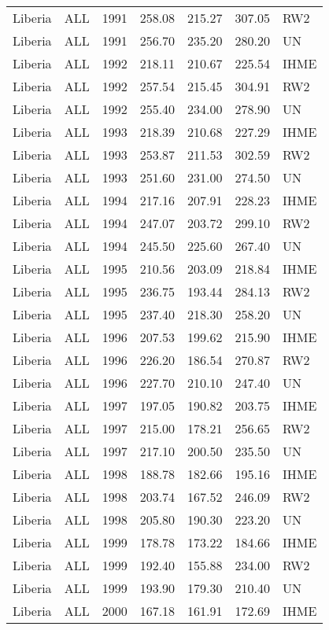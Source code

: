 \begin{longtable}{lllrrrl}
  Liberia & ALL & 1991 & 258.08 & 215.27 & 307.05 & RW2 \\ 
  Liberia & ALL & 1991 & 256.70 & 235.20 & 280.20 & UN \\ 
  Liberia & ALL & 1992 & 218.11 & 210.67 & 225.54 & IHME \\ 
  Liberia & ALL & 1992 & 257.54 & 215.45 & 304.91 & RW2 \\ 
  Liberia & ALL & 1992 & 255.40 & 234.00 & 278.90 & UN \\ 
  Liberia & ALL & 1993 & 218.39 & 210.68 & 227.29 & IHME \\ 
  Liberia & ALL & 1993 & 253.87 & 211.53 & 302.59 & RW2 \\ 
  Liberia & ALL & 1993 & 251.60 & 231.00 & 274.50 & UN \\ 
  Liberia & ALL & 1994 & 217.16 & 207.91 & 228.23 & IHME \\ 
  Liberia & ALL & 1994 & 247.07 & 203.72 & 299.10 & RW2 \\ 
  Liberia & ALL & 1994 & 245.50 & 225.60 & 267.40 & UN \\ 
  Liberia & ALL & 1995 & 210.56 & 203.09 & 218.84 & IHME \\ 
  Liberia & ALL & 1995 & 236.75 & 193.44 & 284.13 & RW2 \\ 
  Liberia & ALL & 1995 & 237.40 & 218.30 & 258.20 & UN \\ 
  Liberia & ALL & 1996 & 207.53 & 199.62 & 215.90 & IHME \\ 
  Liberia & ALL & 1996 & 226.20 & 186.54 & 270.87 & RW2 \\ 
  Liberia & ALL & 1996 & 227.70 & 210.10 & 247.40 & UN \\ 
  Liberia & ALL & 1997 & 197.05 & 190.82 & 203.75 & IHME \\ 
  Liberia & ALL & 1997 & 215.00 & 178.21 & 256.65 & RW2 \\ 
  Liberia & ALL & 1997 & 217.10 & 200.50 & 235.50 & UN \\ 
  Liberia & ALL & 1998 & 188.78 & 182.66 & 195.16 & IHME \\ 
  Liberia & ALL & 1998 & 203.74 & 167.52 & 246.09 & RW2 \\ 
  Liberia & ALL & 1998 & 205.80 & 190.30 & 223.20 & UN \\ 
  Liberia & ALL & 1999 & 178.78 & 173.22 & 184.66 & IHME \\ 
  Liberia & ALL & 1999 & 192.40 & 155.88 & 234.00 & RW2 \\ 
  Liberia & ALL & 1999 & 193.90 & 179.30 & 210.40 & UN \\ 
  Liberia & ALL & 2000 & 167.18 & 161.91 & 172.69 & IHME \\ 

\end{longtable}
